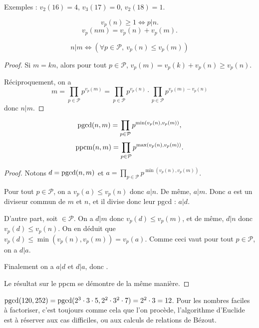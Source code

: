 Exemples : $v_2(16)=4$, $v_3(17)=0$, $v_2(18)=1$.

\begin{proposition}
\[ v_p(n)\geq 1 \iff p|n.\]
\[ v_p(nm) = v_p(n)+v_p(m).\]
\end{proposition}

\begin{proposition}
\[ 
n|m \iff \left(\forall p\in \mathcal P, \: v_p(n)\leq v_p(m)\right)
\]
\end{proposition}
\begin{proof}
Si $m = kn$, alors pour tout $p\in \mathcal P$, $v_p(m) = v_p(k)+v_p(n) \geq v_p(n)$.

Réciproquement, on a 
\[ 
m
= \prod_{p\in\mathcal P}p^{v_p(m)}
= \prod_{p\in\mathcal P}p^{v_p(n)} \cdot \prod_{p\in\mathcal P}p^{v_p(m)-v_p(n)}
\]
donc $n|m$.
\end{proof}

\begin{corollaire}
\[
\operatorname{pgcd}(n,m) = \prod_{p\in\mathcal P}p^{\min(v_p(n),v_p(m))},
\]
\[
\operatorname{ppcm}(n,m) = \prod_{p\in\mathcal P}p^{\max(v_p(n),v_p(m))}.
\]
\end{corollaire}
\begin{proof}
Notons $d=\operatorname{pgcd}(n,m)$ et $a = \prod_{p\in\mathcal P}p^{\min(v_p(n),v_p(m))}$.

Pour tout $p\in \mathcal P$, on a $v_p(a) \leq v_p(n)$ donc $a|n$. De même, $a|m$. Donc $a$ est un diviseur commun de $m$ et $n$, et il divise donc leur pgcd : $a|d$.

D'autre part, soit $\in \mathcal P$. On a $d|m$ donc $v_p(d)\leq v_p(m)$, et de même, $d|n$ donc $v_p(d)\leq v_p(n)$. On en déduit que $v_p(d) \leq \min(v_p(n),v_p(m)) = v_p(a)$. Comme ceci vaut pour tout $p\in \mathcal P$, on a $d|a$.

Finalement on a $a|d$ et $d|a$, donc .

Le résultat sur le ppcm se démontre de la même manière.
\end{proof}

\begin{exemple}
$\operatorname{pgcd}(120,252)=\operatorname{pgcd}(2^3\cdot 3\cdot 5,2^2\cdot 3^2\cdot 7) =2^2\cdot 3=12$.
Pour les nombres faciles à factoriser, c'est toujours comme cela que l'on procède, l'algorithme d'Euclide est à réserver aux cas difficiles, ou aux calculs de relations de Bézout.
\end{exemple}


